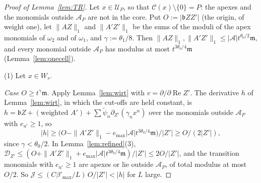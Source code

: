 \begin{proof}[Proof of Lemma~\ref{lem:TR}]
Let $x\in\mathcal U_P$, so that $\mathcal C(x)\setminus\{0\}=P$: the apexes and the monomials outside $\mathcal A_P$ are not in
the core. Put $O:=|\mathfrak bZZ'|$ (the origin, of weight one), let $\|AZ\|_1$ and $\|A'Z'\|_1$ be the sums of the moduli
of the apex monomials of $\omega_2$ and of $\omega_1$, and $\gamma:=\theta_1/8$. Then
$\|AZ\|_1,\|A'Z'\|_1\le|\mathcal A|t^{\theta_0/2}\mathfrak m$, and every monomial outside $\mathcal A_P$ has modulus at most
$t^{3\theta_0/4}\mathfrak m$ (Lemma~\ref{lem:onecell}).

(1) Let $x\in W_s$.

\emph{Case $O\ge t^\gamma\mathfrak m$.} Apply Lemma~\ref{lem:wirt} with $v=\partial/\partial\operatorname{Re}Z'$. The derivative
$h$ of Lemma~\ref{lem:wirt}, in which the cut-offs are held constant, is
$h=\mathfrak bZ+(\text{weighted }A')+\sum\tilde\psi_n\partial_{Z'}(\gamma_nx^n)$ over the monomials outside $\mathcal A_P$ with
$e_{u'}\ge1$, so
\[
|h|\ge\bigl(O-\|A'Z'\|_1-e_{\max}|\mathcal A|t^{3\theta_0/4}\mathfrak m\bigr)/|Z'|\ge O/(2|Z'|),
\]
since $\gamma<\theta_0/2$. In Lemma~\ref{lem:refined}(3),
$\mathcal D_{Z'}\le(O+\|A'Z'\|_1+e_{\max}|\mathcal A|t^{3\theta_0/4}\mathfrak m)/|Z'|\le2O/|Z'|$, and the transition monomials
with $e_{u'}\ge1$ are apexes or lie outside $\mathcal A_P$, of total modulus at most $O/2$. So
$\mathcal J\le(C\beta'_{\max}/L)\,O/|Z'|<|h|$ for $L$ large.


\end{proof}
